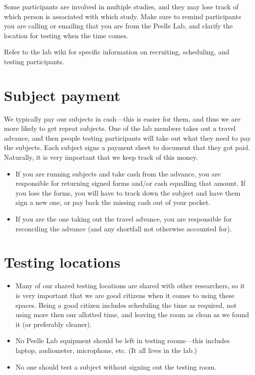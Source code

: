 \documentclass[letterpaper,12pt,oneside]{memoir}
\begin{document}
Some participants are involved in multiple studies, and they may lose track of which person is associated with which study. Make sure to remind participants you are calling or emailing that you are from the Peelle Lab, and clarify the location for testing when the time comes.

Refer to the lab wiki for specific information on recruiting, scheduling, and testing participants.


\section{Subject payment}
\label{sec:subject_payment}

We typically pay our subjects in cash---this is easier for them, and thus we are more likely to get repeat subjects. One of the lab members takes out a travel advance, and then people testing participants will take out what they need to pay the subjects. Each subject signs a payment sheet to document that they got paid. Naturally, it is very important that we keep track of this money.

\begin{itemize}
\item If you are running subjects and take cash from the advance, you are responsible for returning signed forms and/or cash equalling that amount. If you lose the forms, you will have to track down the subject and have them sign a new one, or pay back the missing cash out of your pocket.
\item If you are the one taking out the travel advance, you are responsible for reconciling the advance (and any shortfall not otherwise accounted for).
\end{itemize}



\section{Testing locations}
\label{sec:testing_locations}

\begin{itemize}
\item Many of our shared testing locations are shared with other researchers, so it is very important that we are good citizens when it comes to using these spaces. Being a good citizen includes scheduling the time as required, not using more then our allotted time, and leaving the room as clean as we found it (or preferably cleaner).
\item No Peelle Lab equipment should be left in testing rooms---this includes laptop, audiometer, microphone, etc. (It all lives in the lab.)
\item No one should test a subject without signing out the testing room.
\end{itemize}
\end{document}
